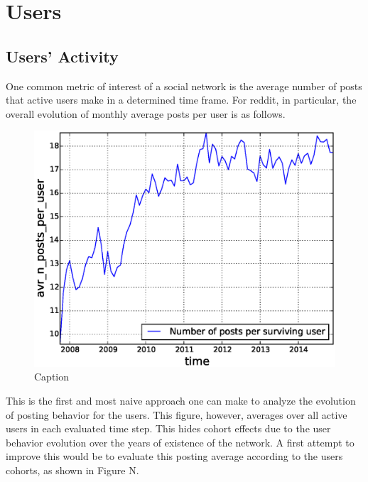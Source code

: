 \section{Users}

\subsection{Users' Activity}

One common metric of interest of a social network is the average number of posts that active users make in a determined time frame. For reddit, in particular, the overall evolution of monthly average posts per user is as follows.

\begin{figure}[!tb]
\centering
\includegraphics[scale=0.4]{./images/avr_posts_per_user_over_time_total.eps}
\caption{Caption}
\label{fig:avr_posts_per_user_over_time_total}
\end{figure}

This is the first and most naive approach one can make to analyze the evolution of posting behavior for the users. This figure, however, averages over all active users in each evaluated time step. This hides cohort effects due to the user behavior evolution over the years of existence of the network. A first attempt to improve this would be to evaluate this posting average according to the users cohorts, as shown in Figure N.

